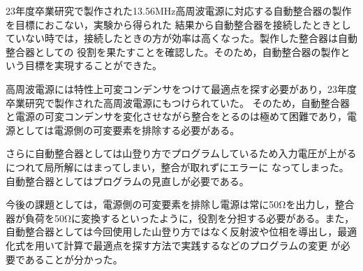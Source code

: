 \documentclass[uplatex, 12pt,oneside,openany]{ujbook}
\begin{document}
23年度卒業研究で製作された13.56MHz高周波電源に対応する自動整合器の製作を目標におこない，実験から得られた
結果から自動整合器を接続したときとしていない時では，接続したときの方が効率は高くなった。製作した整合器は自動整合器としての
役割を果たすことを確認した。そのため，自動整合器の製作という目標を実現することができた。

高周波電源には特性上可変コンデンサをつけて最適点を探す必要があり，23年度卒業研究で製作された高周波電源にもつけられていた。
そのため，自動整合器と電源の可変コンデンサを変化させながら整合をとるのは極めて困難であり，電源としては電源側の可変要素を排除する必要がある。

さらに自動整合器としては山登り方でプログラムしているため入力電圧が上がるにつれて局所解にはまってしまい，整合が取れずにエラーに
なってしまった。自動整合器としてはプログラムの見直しが必要である。

今後の課題としては，電源側の可変要素を排除し電源は常に50Ωを出力し，整合器が負荷を50Ωに変換するといったように，役割を分担する必要がある。また，
自動整合器としては今回使用した山登り方ではなく反射波や位相を導出し，最適化式を用いて計算で最適点を探す方法で実践するなどのプログラムの変更
が必要であることが分かった。
\end{document}
